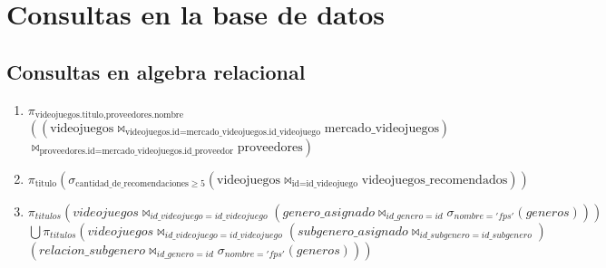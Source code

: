 \documentclass[12pt]{article}
\begin{document}
\newpage
\section{Consultas en la base de datos}
\subsection{Consultas en algebra relacional}
\begin{enumerate}
    \item
    $\pi_{\text{videojuegos.titulo}, \text{proveedores.nombre}}$\\
    $\left( \left( \text{videojuegos} \bowtie_{\text{videojuegos.id} = \text{mercado\_videojuegos.id\_videojuego}} \text{mercado\_videojuegos} \right) \right.$\\
    $\left. \bowtie_{\text{proveedores.id} = \text{mercado\_videojuegos.id\_proveedor}} \text{proveedores} \right)$
    \item $
    \pi_{\text{titulo}} 
    \left( 
        \sigma_{\text{cantidad\_de\_recomendaciones} \geq 5} 
        \left( 
            \text{videojuegos} \bowtie_{\text{id} = \text{id\_videojuego}} \text{videojuegos\_recomendados} 
        \right) 
    \right)
    $
    \item $\pi_{titulos}
    \left(
        videojuegos \bowtie_{id\_videojuego=id\_videojuego} 
        \left( 
            genero\_asignado \bowtie_{id\_genero=id} 
            \sigma_{nombre='fps'}(generos) 
        \right) 
    \right) 
$\\$\bigcup \pi_{titulos}
\left(
    videojuegos \bowtie_{id\_videojuego=id\_videojuego} 
    \left( 
        subgenero\_asignado \bowtie_{id\_subgenero=id\_subgenero} 
    \right)
\right.$ \\ $
\left.
    \left( 
        relacion\_subgenero \bowtie_{id\_genero=id} 
        \sigma_{nombre='fps'}(generos) 
    \right) 
\right)
$
\end{enumerate}
\end{document}
